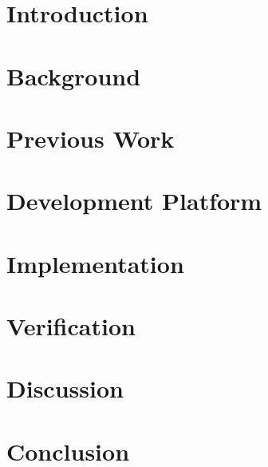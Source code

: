 \documentclass[a4paper,twoside,12pt]{book}
\begin{document}
\setcounter{tocdepth}{2}

\cleardoublepage
{}
{}
\tableofcontents

\cleardoublepage
{}
{}
\listoffigures

\cleardoublepage
{}
{}
\listoftables

\cleardoublepage
{}

\chapter{Introduction}
    \label{ch:introduction}
    

\chapter{Background}
    \label{ch:background}
    

\chapter{Previous Work}
    \label{ch:previous-work}
    

\chapter{Development Platform}
    \label{ch:development-platform}
    

\chapter{Implementation}
    \label{ch:implementation}
    

\chapter{Verification}
    \label{ch:verification}
    

\chapter{Discussion}
    \label{ch:discussion}
    

\chapter{Conclusion}
    \label{ch:conclusion}
    
\end{document}
